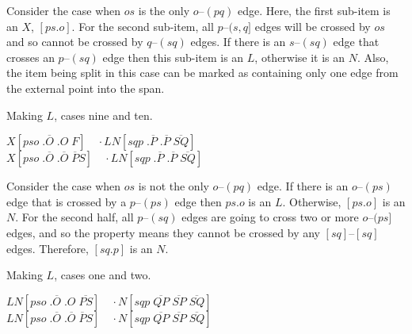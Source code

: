 Consider the case when $os$ is the only $o$--$(pq)$ edge.
Here, the first sub-item is an $X$, $[ps.o]$.
For the second sub-item, all $p$--$(s, q]$ edges will be crossed by $os$ and so cannot be crossed by $q$--$(sq)$ edges.
If there is an $s$--$(sq)$ edge that crosses an $p$--$(sq)$ edge then this sub-item is an $L$, otherwise it is an $N$.
Also, the item being split in this case can be marked as containing only one edge from the external point into the span.

\begin{finalEquation}
\caption{Making $L$, cases nine and ten.}
  $X[pso \; .\overline{O} \; .O \; F] \quad \cdotp LN[sqp \; .\overline{P} \; .\overline{P} \; \overline{SQ}]$ \\
  $X[pso \; .\overline{O} \; .\overline{O} \; \overline{P}S] \quad \cdotp LN[sqp \; .\overline{P} \; .\overline{P} \; \overline{SQ}]$
\end{finalEquation}

\begin{center}
\end{center}

Consider the case when $os$ is not the only $o$--$(pq)$ edge.
If there is an $o$--$(ps)$ edge that is crossed by a $p$--$(ps)$ edge then $ps.o$ is an $L$.
Otherwise, $[ps.o]$ is an $N$.
For the second half, all $p$--$(sq)$ edges are going to cross two or more $o$--$(ps]$ edges, and so the \oneEC property means they cannot be crossed by any $[sq]$--$[sq]$ edges.
Therefore, $[sq.p]$ is an $N$.

\begin{finalEquation}
\caption{Making $L$, cases one and two.}
  $LN[pso \; .\overline{O} \; .O \; \overline{PS}] \quad \cdotp N[sqp \; \overline{QP} \; \overline{SP} \; \overline{SQ}]$ \\
  $LN[pso \; .\overline{O} \; .\overline{O} \; \overline{P}S] \quad \cdotp N[sqp \; \overline{QP} \; \overline{SP} \; \overline{SQ}]$
\end{finalEquation}

